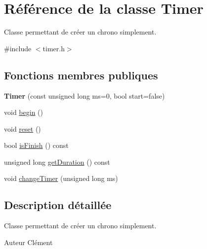\hypertarget{class_timer}{\section{Référence de la classe Timer}
\label{class_timer}
}


Classe permettant de créer un chrono simplement.  




{\ttfamily \#include $<$timer.\+h$>$}

\subsection*{Fonctions membres publiques}
\begin{DoxyCompactItemize}
\item 
\hypertarget{class_timer_ae3971c7588db2242134c6d347f4807b5}{{\bfseries Timer} (const unsigned long ms=0, bool start=false)}\label{class_timer_ae3971c7588db2242134c6d347f4807b5}

\item 
void \hyperlink{class_timer_a4359ac544d52c5811bc94a9b786b8ebd}{begin} ()
\item 
void \hyperlink{class_timer_a9020542d73357a4eef512eefaf57524b}{reset} ()
\item 
bool \hyperlink{class_timer_aca3cd60fd9e4230c15df739b198314ca}{is\+Finish} () const 
\item 
unsigned long \hyperlink{class_timer_ab8948606e831ba658600356a95122b66}{get\+Duration} () const 
\item 
void \hyperlink{class_timer_a9f19059b50d7158881176a452bd2e70f}{change\+Timer} (unsigned long ms)
\end{DoxyCompactItemize}


\subsection{Description détaillée}
Classe permettant de créer un chrono simplement. 

\begin{DoxyAuthor}{Auteur}
Clément 
\end{DoxyAuthor}


